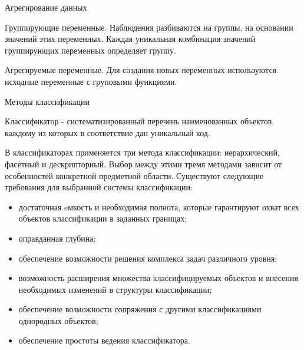 \documentclass{beamer}
\begin{document}
\begin{frame}{Агрегирование данных} 

Группирующие переменные. Наблюдения разбиваются на группы, на основании значений этих переменных. Каждая уникальная комбинация значений группирующих переменных определяет группу. 

Агрегируемые переменные. Для создания новых переменных используются исходные переменные с груповыми функциями.  



\end{frame}









\begin{frame}{Методы классификации} 

Классификатор -  систематизированный перечень наименованных объектов, каждому из которых в соответствие дан уникальный код.  

В классификаторах применяется три метода классификации: иерархический, фасетный и дескрипторный. 
Выбор между этими тремя методами зависит от особенностей конкретной предметной области. 
Существуют следующие требования для выбранной системы классификации:

\begin{itemize}
 \item достаточная eмкость и необходимая полнота, которые гарантируют охват всех объектов классификации в заданных границах;
 \item оправданная глубина;
 \item обеспечение возможности решения комплекса задач различного уровня;
 \item возможность расширения множества классифицируемых объектов и внесения необходимых изменений в структуры классификации;
 \item обеспечение возможности сопряжения с другими классификациями однородных объектов;
 \item обеспечение простоты ведения классификатора.

\end{itemize}
 

\end{frame}
\end{document}
